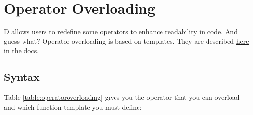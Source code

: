 \section{Operator Overloading} \label{operatoroverloading}

D allows users to redefine some operators to enhance readability in code. And guess what? Operator overloading is based on templates. They are described \href{www.d-programming-language.org/operators.html}{here} in the docs. 

\subsection{Syntax}

Table \ref{table:operatoroverloading} gives you the operator that you can overload and which function template you must define:


